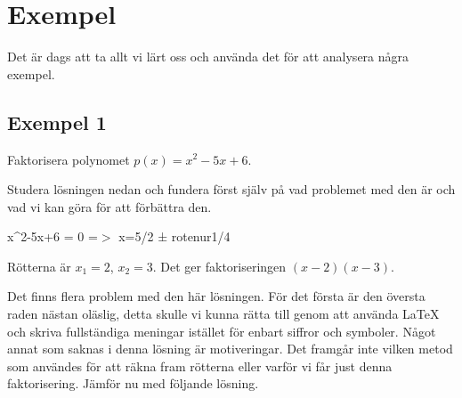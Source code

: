 \documentclass[titlepage]{article}
\begin{document}

\section{Exempel}

Det är dags att ta allt vi lärt oss och använda det för att analysera några exempel.



\subsection*{Exempel 1}

\begin{center}
\begin{tcolorbox}[width=\linewidth,colback={white},title={\textbf{Problem}},outer arc=0mm,colupper=black]
    Faktorisera polynomet $p(x)=x^2-5x+6$.
\end{tcolorbox} 
\end{center}

Studera lösningen nedan och fundera först själv på vad problemet med den är och vad vi kan göra för att förbättra den.

\begin{center}
\begin{tcolorbox}[width=\linewidth,colback={red!15!white},title={\textbf{Lösning 1 - Sämre}},outer arc=0mm,colupper=black]
    x\textasciicircum2-5x+6 = 0 =$>$ x=5/2 ± rotenur1/4

    Rötterna är $x_1 = 2$, $x_2 = 3$. Det ger faktoriseringen $(x-2)(x-3)$.
\end{tcolorbox} 
\end{center}

Det finns flera problem med den här lösningen. För det första är den översta raden nästan oläslig, detta skulle vi kunna rätta till genom att använda \LaTeX$\:$ och skriva fullständiga meningar istället för enbart siffror och symboler. Något annat som saknas i denna lösning är motiveringar. Det framgår inte vilken metod som användes för att räkna fram rötterna eller varför vi får just denna faktorisering. Jämför nu med följande lösning.
\end{document}
